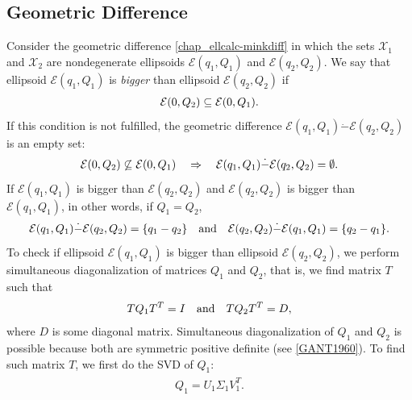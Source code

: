 \documentclass[letterpaper,10pt,english]{sphinxmanual}
\begin{document}
\subsection{Geometric Difference}
\label{chap_ellcalc:geometric-difference}
Consider the geometric difference \eqref{chap_ellcalc-minkdiff} in which the sets
\({\mathcal X}_1\) and \({\mathcal X}_2\) are nondegenerate
ellipsoids \({\mathcal E}(q_1,Q_1)\) and
\({\mathcal E}(q_2,Q_2)\). We say that ellipsoid
\({\mathcal E}(q_1,Q_1)\) is \emph{bigger} than ellipsoid
\({\mathcal E}(q_2,Q_2)\) if
\begin{gather}
\begin{split}{\mathcal E}(0,Q_2) \subseteq {\mathcal E}(0,Q_1).\end{split}\notag
\end{gather}
If this condition is not fulfilled, the geometric difference
\({\mathcal E}(q_1,Q_1)\dot{-}{\mathcal E}(q_2,Q_2)\) is an empty
set:
\begin{gather}
\begin{split}{\mathcal E}(0,Q_2) \not\subseteq {\mathcal E}(0,Q_1) ~~~ \Rightarrow ~~~
{\mathcal E}(q_1,Q_1) \dot{-}{\mathcal E}(q_2,Q_2) = \emptyset.\end{split}\notag
\end{gather}
If \({\mathcal E}(q_1,Q_1)\) is bigger than
\({\mathcal E}(q_2,Q_2)\) and \({\mathcal E}(q_2,Q_2)\) is
bigger than \({\mathcal E}(q_1,Q_1)\), in other words, if
\(Q_1=Q_2\),
\begin{gather}
\begin{split}{\mathcal E}(q_1,Q_1) \dot{-}{\mathcal E}(q_2,Q_2) = \{q_1-q_2\} ~~~ \mbox{and} ~~~
{\mathcal E}(q_2,Q_2) \dot{-}{\mathcal E}(q_1,Q_1) = \{q_2-q_1\}.\end{split}\notag
\end{gather}
To check if ellipsoid \({\mathcal E}(q_1,Q_1)\) is bigger than
ellipsoid \({\mathcal E}(q_2,Q_2)\), we perform simultaneous
diagonalization of matrices \(Q_1\) and \(Q_2\), that is, we
find matrix \(T\) such that
\begin{gather}
\begin{split}TQ_1T^T = I ~~~ \mbox{and} ~~~ TQ_2T^T=D,\end{split}\notag
\end{gather}
where \(D\) is some diagonal matrix. Simultaneous diagonalization
of \(Q_1\) and \(Q_2\) is possible because both are symmetric
positive definite (see {\hyperref[chap_ellcalc:gant1960]{{[}GANT1960{]}}}). To find such matrix
\(T\), we first do the SVD of \(Q_1\):
\label{chap_ellcalc:equation-simdiag1}\begin{gather}
\begin{split}Q_1 = U_1\Sigma_1V_1^T .\end{split}\label{chap_ellcalc-simdiag1}
\end{gather}
\end{document}
